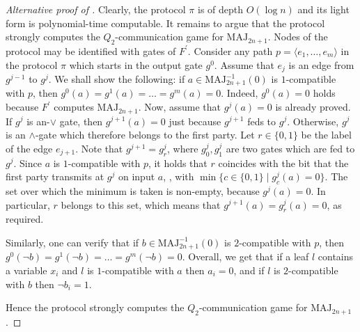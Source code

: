 \documentclass{toc}
\def\MAJ{\mathrm{MAJ}}
\begin{document}
\begin{proof}[Alternative proof of ]
Clearly, the protocol $\pi$ is of depth $O(\log n)$ and its light form is polynomial-time computable.  It remains to argue that the protocol strongly computes the $Q_2$-communication game for $\MAJ_{2n + 1}$. Nodes of the protocol may be identified with gates of $F^\prime$. Consider any path $p = \langle e_1, \ldots, e_m \rangle$ in the protocol $\pi$ which starts in the output gate $g^0$. Assume that $e_j$ is an edge from $g^{j - 1}$ to $g^j$. We shall show the following: if $a\in\MAJ_{2n + 1}^{-1}(0)$ is $1$-compatible with $p$, then $g^0(a) = g^1(a) = \ldots = g^m(a) = 0$. Indeed, $g^0(a) = 0$ holds because $F^\prime$ computes $\MAJ_{2n + 1}$. Now, assume that $g^j(a) = 0$ is already proved. If $g^j$ is an-$\lor$ gate, then $g^{j + 1}(a) = 0$ just because $g^{j + 1}$ feds to $g^j$. Otherwise, $g^j$ is an $\land$-gate which therefore belongs to the first party. Let $r\in\{0, 1\}$ be the label of the edge $e_{j + 1}$. Note that $g^{j + 1}  = g^j_r$, where $g^j_0, g^j_1$ are two gates which are fed to $g^j$. Since $a$ is $1$-compatible with $p$, it holds that $r$ coincides with the bit that the first party transmits at $g^j$ on input $a$, \ie, with $\min\{c \in\{0, 1\} \mid g^j_c(a) = 0\}$. The set over which the minimum is taken is non-empty, because $g^j(a) = 0$. In particular, $r$ belongs to this set, which means that $g^{j + 1}(a) = g^j_r(a) = 0$, as required.

Similarly, one can verify that if $b\in\MAJ_{2n + 1}^{-1}(0)$ is $2$-compatible with $p$, then $g^0(\lnot b) = g^1(\lnot b) = \ldots = g^m(\lnot b) = 0$. Overall, we get that if a leaf $l$
%
%
%
%
%
contains a variable $x_i$ and $l$ is $1$-compatible with $a$
then $a_i=0$, and if $l$ is $2$-compatible with $b$ then
$\lnot b_i = 1$.  %

Hence the protocol strongly computes the $Q_2$-communication game 
for $\MAJ_{2n + 1}$.
\end{proof} 
\end{document}
